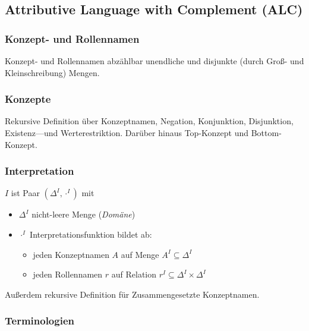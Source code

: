 \subsection{Attributive Language with Complement
(ALC)}\label{attributive-language-with-complement-alc}

\subsubsection{Konzept- und Rollennamen}\label{konzept--und-rollennamen}

Konzept- und Rollennamen abzählbar unendliche und disjunkte (durch Groß-
und Kleinschreibung) Mengen.

\subsubsection{Konzepte}\label{konzepte}

Rekursive Definition über Konzeptnamen, Negation, Konjunktion,
Disjunktion, Existenz---und Werterestriktion. Darüber hinaus Top-Konzept
und Bottom-Konzept.

\subsubsection{Interpretation}\label{interpretation}

$I$ ist Paar $\left( \Delta^{I}, \cdot^{I} \right)$ mit

\begin{itemize}
\item
  $\Delta^{I}$ nicht-leere Menge (\emph{Domäne})
\item
  $\cdot^{I}$ Interpretationsfunktion bildet ab:

  \begin{itemize}
  \item
    jeden Konzeptnamen $A$ auf Menge $A^{I} \subseteq \Delta^{I}$
  \item
    jeden Rollennamen $r$ auf Relation
    $r^{I} \subseteq \Delta^{I} \times \Delta^{I}$
  \end{itemize}
\end{itemize}

Außerdem rekursive Definition für Zusammengesetzte Konzeptnamen.

\subsubsection{Terminologien}\label{terminologien}

